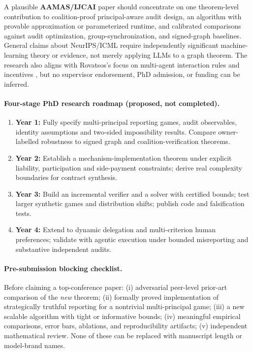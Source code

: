 \documentclass[10pt,a4paper]{article}
\theoremstyle{definition}\newtheorem{definition}[theorem]{Definition}
\begin{document}
A plausible \textbf{AAMAS/IJCAI} paper should concentrate on one theorem-level contribution to coalition-proof principal-aware audit design, an algorithm with provable approximation or parameterized runtime, and calibrated comparisons against audit optimization, group-synchronization, and signed-graph baselines. General claims about NeurIPS/ICML require independently significant machine-learning theory or evidence, not merely applying LLMs to a graph theorem. The research also aligns with Rovatsos's focus on multi-agent interaction rules and incentives \cite{rovatsosprofile}, but no supervisor endorsement, PhD admission, or funding can be inferred.

\paragraph{Four-stage PhD research roadmap (proposed, not completed).}
\begin{enumerate}
\item \textbf{Year 1:} Fully specify multi-principal reporting games, audit observables, identity assumptions and two-sided impossibility results. Compare owner-labelled robustness to signed graph and coalition-verification theorems.
\item \textbf{Year 2:} Establish a mechanism-implementation theorem under explicit liability, participation and side-payment constraints; derive real complexity boundaries for contract synthesis.
\item \textbf{Year 3:} Build an incremental verifier and a solver with certified bounds; test larger synthetic games and distribution shifts; publish code and falsification tests.
\item \textbf{Year 4:} Extend to dynamic delegation and multi-criterion human preferences; validate with agentic execution under bounded misreporting and substantive independent audits.
\end{enumerate}

\paragraph{Pre-submission blocking checklist.} Before claiming a top-conference paper: (i) adversarial peer-level prior-art comparison of the \emph{new} theorem; (ii) formally proved implementation of strategically truthful reporting for a nontrivial multi-principal game; (iii) a new scalable algorithm with tight or informative bounds; (iv) meaningful empirical comparisons, error bars, ablations, and reproducibility artifacts; (v) independent mathematical review. None of these can be replaced with manuscript length or model-brand names.
\end{document}
